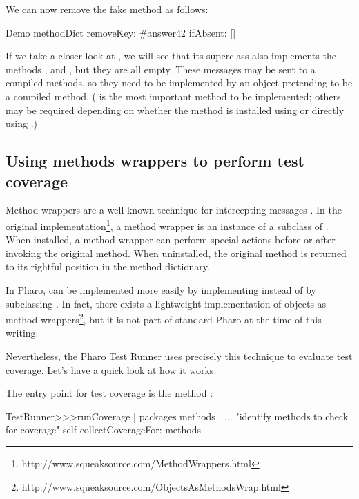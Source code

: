 \documentclass[a4paper,10pt,twoside]{book}
\begin{document}
We can now remove the fake method as follows:
\begin{code}{}
Demo methodDict removeKey: #answer42 ifAbsent: []
\end{code}

If we take a closer look at , we will see that its superclass also implements the methods ,  and , but they are all empty.  These messages may be sent to a compiled methods, so they need to be implemented by an object pretending to be a compiled method.  ( is the most important method to be implemented; others may be required depending on whether the method is installed using  or directly using .)

\subsection{Using methods wrappers to perform test coverage}

Method wrappers are a well-known technique for intercepting messages \cite{Bran98a}.
In the original implementation\footnote{http://www.squeaksource.com/MethodWrappers.html}, a method wrapper is an instance of a subclass of . When installed, a method wrapper can perform special actions before or after invoking the original method.
When uninstalled, the original method is returned to its rightful position in the method dictionary.

In Pharo,  can be implemented more easily by implementing  instead of by subclassing . In fact, there exists a lightweight implementation of objects as method wrappers\footnote{http://www.squeaksource.com/ObjectsAsMethodsWrap.html}, but it is not part of standard Pharo at the time of this writing.

Nevertheless, the Pharo Test Runner uses precisely this technique to evaluate test coverage.
Let's have a quick look at how it works.

The entry point for test coverage is the method :
\begin{code}{}
TestRunner>>>runCoverage
        | packages methods |
        ... "identify methods to check for coverage"
        self collectCoverageFor: methods
\end{code}
\end{document}
